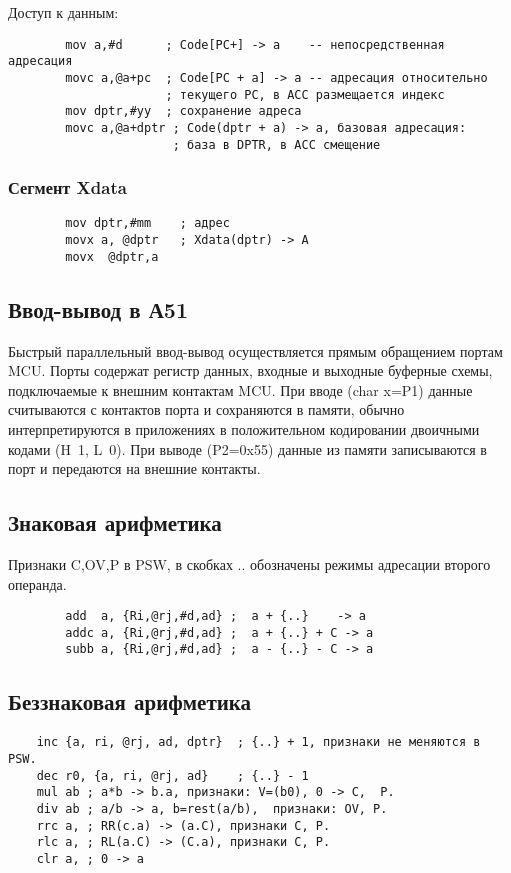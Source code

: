 \documentclass[12pt, a4paper] {ncc}
\begin{document}
        Доступ к данным:
        \begin{verbatim}
        mov a,#d      ; Code[PC+] -> a    -- непосредственная адресация
        movc a,@a+pc  ; Code[PC + a] -> a -- адресация относительно
                      ; текущего РС, в АСС размещается индекс
        mov dptr,#yy  ; сохранение адреса
        movc a,@a+dptr ; Code(dptr + a) -> a, базовая адресация:
                       ; база в DPTR, в АСС смещение
        \end{verbatim}

        \subsubsection{Сегмент Xdata}

        \begin{verbatim}
        mov dptr,#mm    ; адреc
        movx a, @dptr   ; Xdata(dptr) -> А
        movx  @dptr,a
        \end{verbatim}
        \subsection{Ввод-вывод в А51}
        Быстрый параллельный ввод-вывод осуществляется прямым обращением портам MCU.
        Порты содержат регистр данных, входные и выходные буферные схемы, подключаемые к внешним контактам MCU. При вводе (char x=P1) данные
        считываются с контактов  порта и сохраняются в памяти, обычно интерпретируются в приложениях в положительном кодировании двоичными
        кодами (H~1, L~0). При выводе (P2=0x55) данные из памяти записываются в порт и передаются на внешние контакты.

        \subsection{Знаковая арифметика}
            Признаки C,OV,P в PSW, в скобках {.. } обозначены режимы адресации второго операнда.
            \begin{verbatim}
        add  a, {Ri,@rj,#d,ad} ;  a + {..}    -> a
        addc a, {Ri,@rj,#d,ad} ;  a + {..} + C -> a
        subb a, {Ri,@rj,#d,ad} ;  a - {..} - C -> a
            \end{verbatim}
        \subsection{Беззнаковая арифметика}
            \begin{verbatim}
    inc {a, ri, @rj, ad, dptr}  ; {..} + 1, признаки не меняются в PSW.
    dec r0, {a, ri, @rj, ad}    ; {..} - 1
    mul ab ; a*b -> b.a, признаки: V=(b0), 0 -> C,  P.
    div ab ; a/b -> a, b=rest(a/b),  признаки: OV, P.
    rrc a, ; RR(c.a) -> (a.C), признаки C, P.
    rlc a, ; RL(a.C) -> (C.a), признаки C, P.
    clr a, ; 0 -> a
            \end{verbatim}
\end{document}
